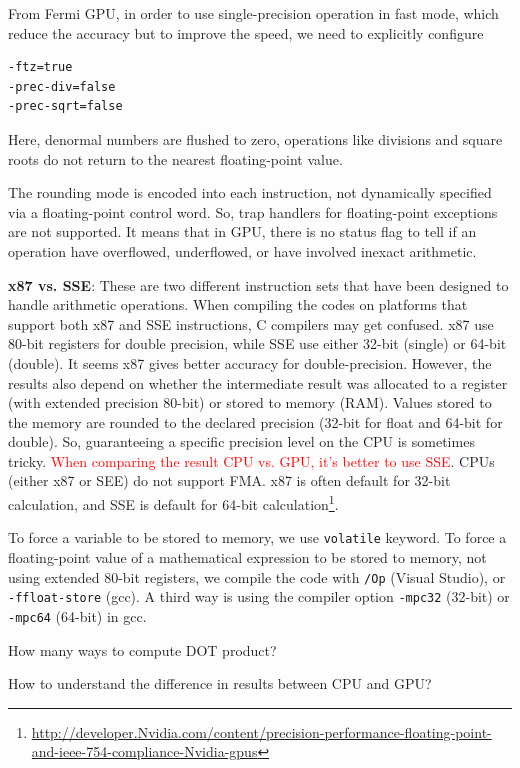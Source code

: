 From Fermi GPU, in order to use single-precision operation in fast mode, which
reduce the accuracy but to improve the speed, we need to explicitly configure
\begin{verbatim}
-ftz=true
-prec-div=false
-prec-sqrt=false
\end{verbatim}
Here, denormal numbers are flushed to zero, operations like divisions and square
roots do not return to the nearest floating-point value. 

\begin{framed}
The rounding mode is encoded into each instruction, not dynamically specified
via a floating-point control word. So, trap handlers for floating-point
exceptions are not supported. It means that in GPU, there is no status flag to
tell if an operation have overflowed, underflowed, or have involved inexact
arithmetic.
\end{framed}

{\bf x87 vs. SSE}: These are two different instruction sets that have been
designed to handle arithmetic operations. When compiling the codes on platforms
that support both x87 and SSE instructions, C compilers may get confused. x87
use 80-bit registers for double  precision, while SSE use either 32-bit (single)
or 64-bit (double). It seems x87 gives better accuracy for double-precision.
However, the results also depend on whether the intermediate result was
allocated to a register (with extended precision 80-bit) or stored to memory
(RAM). Values stored to the memory are rounded to the declared precision (32-bit
for float and 64-bit for double). So, guaranteeing a specific precision level on
the CPU is sometimes tricky. \textcolor{red}{When comparing the result CPU
vs.
GPU, it's better to use SSE}. CPUs (either x87 or SEE) do not support FMA. x87
is often default for 32-bit calculation, and SSE is default for 64-bit
calculation\footnote{\url{http://developer.Nvidia.com/content/precision-performance-floating-point-and-ieee-754-compliance-Nvidia-gpus}}.

To force a variable to be stored to memory, we use \verb!volatile! keyword. To
force a floating-point value of a mathematical expression to be stored to
memory, not using extended 80-bit registers, we compile the code with \verb!/Op!
(Visual Studio), or \verb!-ffloat-store! (gcc). A third way is using the
compiler option \verb!-mpc32! (32-bit) or \verb!-mpc64! (64-bit) in gcc. 

How many ways to compute DOT product?

How to understand the difference in results between CPU and GPU?

